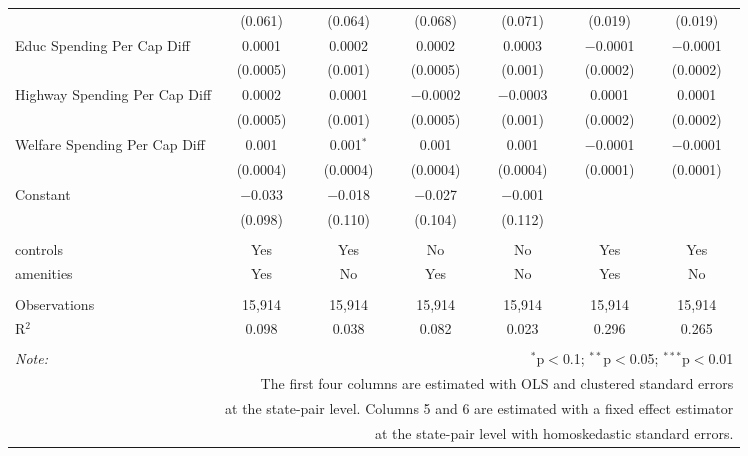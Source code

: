 \begin{table}[!htbp]
\begin{tabular}{@{\extracolsep{5pt}}lcccccc}
  & (0.061) & (0.064) & (0.068) & (0.071) & (0.019) & (0.019) \\ 
  Educ Spending Per Cap Diff & 0.0001 & 0.0002 & 0.0002 & 0.0003 & $-$0.0001 & $-$0.0001 \\ 
  & (0.0005) & (0.001) & (0.0005) & (0.001) & (0.0002) & (0.0002) \\ 
  Highway Spending Per Cap Diff & 0.0002 & 0.0001 & $-$0.0002 & $-$0.0003 & 0.0001 & 0.0001 \\ 
  & (0.0005) & (0.001) & (0.0005) & (0.001) & (0.0002) & (0.0002) \\ 
  Welfare Spending Per Cap Diff & 0.001 & 0.001$^{*}$ & 0.001 & 0.001 & $-$0.0001 & $-$0.0001 \\ 
  & (0.0004) & (0.0004) & (0.0004) & (0.0004) & (0.0001) & (0.0001) \\ 
  Constant & $-$0.033 & $-$0.018 & $-$0.027 & $-$0.001 &  &  \\ 
  & (0.098) & (0.110) & (0.104) & (0.112) &  &  \\ 
 \hline \\[-1.8ex] 
controls & Yes & Yes & No & No & Yes & Yes \\ 
amenities & Yes & No & Yes & No & Yes & No \\ 
\hline \\[-1.8ex] 
Observations & 15,914 & 15,914 & 15,914 & 15,914 & 15,914 & 15,914 \\ 
R$^{2}$ & 0.098 & 0.038 & 0.082 & 0.023 & 0.296 & 0.265 \\ 
\hline 
\hline \\[-1.8ex] 
\textit{Note:}  & \multicolumn{6}{r}{$^{*}$p$<$0.1; $^{**}$p$<$0.05; $^{***}$p$<$0.01} \\ 
 & \multicolumn{6}{r}{The first four columns are estimated with OLS and clustered standard errors} \\ 
 & \multicolumn{6}{r}{at the state-pair level. Columns 5 and 6 are estimated with a fixed effect estimator} \\ 
 & \multicolumn{6}{r}{at the state-pair level with homoskedastic standard errors.} \\ 
\end{tabular} 
\end{table} 
